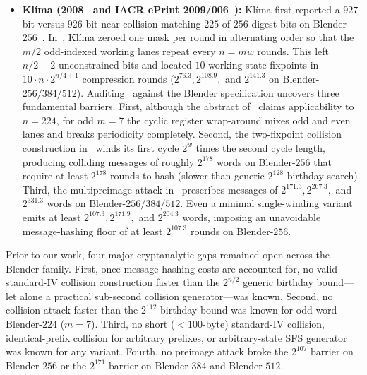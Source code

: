 \documentclass[11pt,a4paper]{article}
\theoremstyle{definition}
\theoremstyle{remark}
\begin{document}
\begin{itemize}[leftmargin=2em]
    \item \textbf{Kl\'{i}ma (2008~\cite{Kli08} and IACR ePrint 2009/006~\cite{Kli09}):} Kl\'{i}ma first reported a $927$-bit versus $926$-bit near-collision matching $225$ of $256$ digest bits on Blender-$256$~\cite{Kli08}. In~\cite{Kli09}, Kl\'{i}ma zeroed one mask per round in alternating order so that the $m/2$ odd-indexed working lanes repeat every $n = mw$ rounds. This left $n/2 + 2$ unconstrained bits and located $10$ working-state fixpoints in $10 \cdot n \cdot 2^{n/4 + 1}$ compression rounds ($2^{76.3}, 2^{108.9},$ and $2^{141.3}$ on Blender-$256/384/512$). Auditing~\cite{Kli09} against the Blender specification uncovers three fundamental barriers. First, although the abstract of~\cite{Kli09} claims applicability to $n = 224$, for odd $m = 7$ the cyclic register wrap-around mixes odd and even lanes and breaks periodicity completely. Second, the two-fixpoint collision construction in~\cite[Sec.~4]{Kli09} winds its first cycle $2^w$ times the second cycle length, producing colliding messages of roughly $2^{178}$ words on Blender-$256$ that require at least $2^{178}$ rounds to hash (slower than generic $2^{128}$ birthday search). Third, the multipreimage attack in~\cite[Sec.~5]{Kli09} prescribes messages of $2^{171.3}, 2^{267.3},$ and $2^{331.3}$ words on Blender-$256/384/512$. Even a minimal single-winding variant emits at least $2^{107.3}, 2^{171.9},$ and $2^{204.3}$ words, imposing an unavoidable message-hashing floor of at least $2^{107.3}$ rounds on Blender-$256$.
\end{itemize}

Prior to our work, four major cryptanalytic gaps remained open across the Blender family. First, once message-hashing costs are accounted for, no valid standard-IV collision construction faster than the $2^{n/2}$ generic birthday bound---let alone a practical sub-second collision generator---was known. Second, no collision attack faster than the $2^{112}$ birthday bound was known for odd-word Blender-$224$ ($m=7$). Third, no short ($< 100$-byte) standard-IV collision, identical-prefix collision for arbitrary prefixes, or arbitrary-state SFS generator was known for any variant. Fourth, no preimage attack broke the $2^{107}$ barrier on Blender-$256$ or the $2^{171}$ barrier on Blender-$384$ and Blender-$512$.
\end{document}
